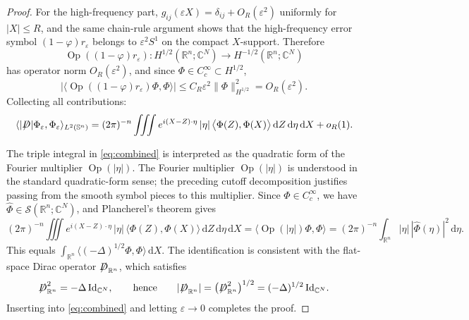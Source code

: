 \documentclass[a4paper, 12pt]{article}
\def\slashiii#1{\setbox0=\hbox{$#1$}#1\hskip-\wd0\hbox to\wd0{\hss\sl/\/\hss}}
\begin{document}
\begin{proof}
	For the
	high-frequency part, $g_{ij}(\varepsilon X) = \delta_{ij} + O_R(\varepsilon^2)$
	uniformly for $|X| \le R$, and the same chain-rule argument shows that the high-frequency error symbol \((1-\varphi)r_\varepsilon\) belongs to
	\(\varepsilon^2 S^1\) on the compact \(X\)-support. Therefore
	\[
	\operatorname{Op}((1-\varphi)r_\varepsilon):
	H^{1/2}(\mathbb R^n;\mathbb C^N)
	\to
	H^{-1/2}(\mathbb R^n;\mathbb C^N)
	\]
	has operator norm \(O_R(\varepsilon^2)\), and since
	\(\Phi\in C_c^\infty\subset H^{1/2}\),
	\[
	\bigl|	\langle	\operatorname{Op}((1-\varphi)r_\varepsilon)\Phi,\Phi	\rangle	\bigr|	\le	C_R\varepsilon^2\|\Phi\|_{H^{1/2}}^2
	=	O_R(\varepsilon^2).
	\]
	Collecting all contributions:
	\begin{equation}\label{eq:combined}
		\langle |\slashiii{D}|\Phi_\varepsilon,\Phi_\varepsilon\rangle_{L^2(\mathbb{S}^n)}
		= (2\pi)^{-n}
		\iiint
		e^{i(X-Z)\cdot\eta}\,|\eta|\,
		\bigl\langle\Phi(Z),\Phi(X)\bigr\rangle
		\,\mathrm{d}Z\,\mathrm{d}\eta\,\mathrm{d}X
		+ o_R(1).
	\end{equation}
	
	The triple integral in \eqref{eq:combined} is interpreted as the quadratic
	form of the Fourier multiplier $\operatorname{Op}(|\eta|)$. The Fourier multiplier \(\operatorname{Op}(|\eta|)\) is understood in the
	standard quadratic-form sense; the preceding cutoff decomposition justifies
	passing from the smooth symbol pieces to this multiplier. Since
	$\Phi \in C_c^\infty$, we have $\hat\Phi \in \mathcal{S}(\mathbb{R}^n;\mathbb{C}^N)$,
	and Plancherel's theorem gives
	\[
	(2\pi)^{-n}
	\iiint
	e^{i(X-Z)\cdot\eta}\,|\eta|\,
	\langle\Phi(Z),\Phi(X)\rangle
	\,\mathrm{d}Z\,\mathrm{d}\eta\,\mathrm{d}X
	= \langle\operatorname{Op}(|\eta|)\Phi,\Phi\rangle
	= (2\pi)^{-n}\int_{\mathbb{R}^n}|\eta|\,|\hat\Phi(\eta)|^2\,\mathrm{d}\eta.
	\]
	This equals $\int_{\mathbb{R}^n}\langle(-\Delta)^{1/2}\Phi,\Phi\rangle\,\mathrm{d}X$.
	The identification is consistent with the flat-space Dirac operator
	$\slashiii{D}_{\mathbb{R}^n}$, which satisfies
	\[
	\slashiii{D}_{\mathbb{R}^n}^2 = -\Delta\,\mathrm{Id}_{\mathbb{C}^N},
	\qquad\text{hence}\qquad
	|\slashiii{D}_{\mathbb{R}^n}|
	= \bigl(\slashiii{D}_{\mathbb{R}^n}^2\bigr)^{1/2}
	= (-\Delta)^{1/2}\,\mathrm{Id}_{\mathbb{C}^N}.
	\]
	Inserting into \eqref{eq:combined} and letting $\varepsilon \to 0$ completes
	the proof.
\end{proof}
\end{document}
